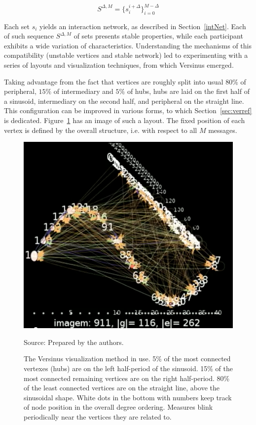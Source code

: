 \begin{equation}
	S^{\Delta,M}=\{s_i^{i+\Delta}\}_{i=0}^{M-\Delta}
\end{equation}

Each set $s_i$ yields an interaction network, as described in Section~\ref{intNet}.
Each of such sequence $S^{\Delta,M}$ of sets presents stable properties,
while each participant exhibits a wide variation of characteristics.
Understanding the mechanisms of this compatibility (unstable vertices and stable network)
led to experimenting with a series of layouts and visualization techniques, from which Versinus emerged.

Taking advantage from the fact that vertices are roughly split into usual $80\%$ of peripheral, $15\%$ of intermediary and $5\%$ of hubs,
hubs are laid on the first half of a sinusoid,
intermediary on the second half,
and peripheral on the straight line.
This configuration can be improved in various forms, to which Section~\ref{sec:verref} is dedicated.
Figure~\ref{fig:versinus} has an image of such a layout.
The fixed position of each vertex is defined by the overall structure,
i.e. with respect to all $M$ messages.

\begin{figure}[h!]
	\begin{center}
				    \caption{The Versinus visualization method in use. 5\% of the most connected vertexes (hubs) are on the left half-period of the sinusoid.
				    15\% of the most connected remaining vertices are on the right half-period.
				    80\% of the least connected vertices are on the straight line, above the sinusoidal shape.
				    White dots in the bottom with numbers keep track of node position in the overall degree ordering.
				    Measures blink periodically near the vertices they are related to.}
		\includegraphics[scale=.45]{figs/versinus_}
					    \label{fig:versinus}
\begin{flushleft}
		Source: Prepared by the authors.\
\end{flushleft}
	\end{center}
\end{figure}


